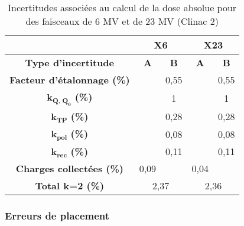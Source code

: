 \documentclass{article}
\begin{document}
\begin{table}[h]
  \centering
  \begin{tabular}{c|cc|cc|}
  \cline{2-5}
                                                           & \multicolumn{2}{c|}{\textbf{X6}} & \multicolumn{2}{c|}{\textbf{X23}} \\ \hline
  \multicolumn{1}{|c|}{\textbf{Type d'incertitude}}        & \textbf{A}      & \textbf{B}     & \textbf{A}      & \textbf{B}      \\ \hline
  \multicolumn{1}{|c|}{\textbf{Facteur d'étalonnage (\%)}} &                 & 0,55           &                 & 0,55            \\
  \multicolumn{1}{|c|}{$\mathbf{k_{Q,\,Q_0}}$ \textbf{(\%)}}                &                 & 1              &                 & 1               \\
  \multicolumn{1}{|c|}{$\mathbf{k_{TP}}$ \textbf{(\%)}}                  &                 & 0,28           &                 & 0,28            \\
  \multicolumn{1}{|c|}{$\mathbf{k_{pol}}$ \textbf{(\%)}}                 &                 & 0,08           &                 & 0,08            \\
  \multicolumn{1}{|c|}{$\mathbf{k_{rec}}$ \textbf{(\%)}}                 &                 & 0,11           &                 & 0,11            \\
  \multicolumn{1}{|c|}{\textbf{Charges collectées (\%)}}   & 0,09            &                & 0,04            &                 \\ \hline
  \multicolumn{1}{|c|}{\textbf{Total k=2 (\%)}}            & \multicolumn{2}{c|}{2,37}        & \multicolumn{2}{c|}{2,36}         \\ \hline
  \end{tabular}
  \caption{Incertitudes associées au calcul de la dose absolue pour des faisceaux de 6 MV et de 23 MV (Clinac 2)}
  \label{table_incertitudes_abs}
\end{table}

\subsubsection{Erreurs de placement}
\end{document}

